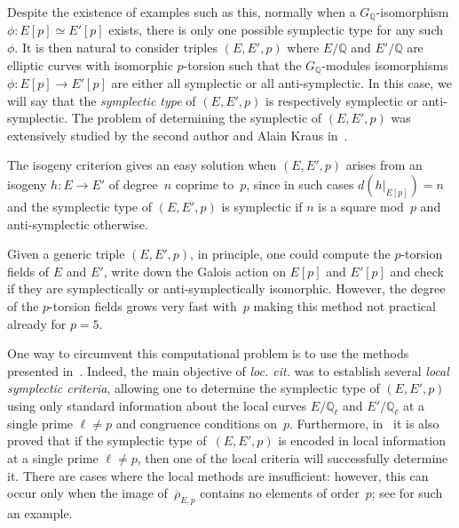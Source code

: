 \documentclass[12pt]{amsart}
\newcommand{\Q}{\mathbb{Q}}
\newcommand{\Z}{\mathbb{Z}}
\newcommand{\rhobar}{{\overline{\rho}}}
\numberwithin{equation}{section}
\theoremstyle{definition}
\theoremstyle{remark}
\begin{document}
\begin{comment}
both have $5$-torsion Galois module isomorphic to $\mu_5
\times \Z/5\Z$.  Now let $P,Q \in E[5]$ and $P',Q' \in E'[5]$ be bases
such that $P$, $P'$ are defined over~$\Q$.  The map defined by $P
\mapsto P'$ and $Q \mapsto n\cdot Q'$ (with $5 \nmid n$) is a
$G_\Q$-isomorphism which is symplectic if and only if $n$ is a square
mod~$5$.  Moreover, the automorphism $\alpha$ of $E[5]$ given by
$\alpha(P) = P$ and $\alpha(Q) = 2Q$ is anti-symplectic because $2$ is
not a square modulo~$5$.
\end{comment}

Despite the existence of examples such as this, normally when a
$G_\Q$-isomorphism $\phi : E[p] \simeq E'[p]$ exists, there is only
one possible symplectic type for any such~$\phi$.  It is then natural
to consider triples $(E,E',p)$ where $E/\Q$ and $E'/\Q$ are elliptic
curves with isomorphic $p$-torsion such that the $G_\Q$-modules
isomorphisms $\phi : E[p] \rightarrow E'[p]$ are either all symplectic
or all anti-symplectic.  In this case, we will say that the {\it
  symplectic type} of $(E,E',p)$ is respectively symplectic or
anti-symplectic.  The problem of determining the symplectic of
$(E,E',p)$ was extensively studied by the second author and Alain
Kraus in~\cite{FKSym}.

The isogeny criterion gives an easy solution when $(E,E',p)$
arises from an isogeny $h \colon E \to E'$ of degree~$n$ coprime
to~$p$, since in such cases $d(h|_{E[p]}) = n$ and the symplectic type
of $(E,E',p)$ is symplectic if $n$ is a square mod~$p$ and
anti-symplectic otherwise.

Given a generic triple $(E, E', p)$, in principle, one
could compute the $p$-torsion fields of $E$ and $E'$,
write down the Galois action on $E[p]$ and $E'[p]$ and check if they
are symplectically or anti-symplectically isomorphic. However, the
degree of the $p$-torsion fields grows very fast with~$p$ making this
method not practical already for $p = 5$.

One way to circumvent this computational problem is to use the methods
presented in~\cite{FKSym}. Indeed, the main objective of {\it
  loc. cit.} was to establish several {\it local symplectic criteria},
allowing one to determine the symplectic type of $(E,E',p)$ using only
standard information about the local curves $E/\Q_\ell$ and
$E'/\Q_\ell$ at a single prime $\ell \neq p$ and congruence conditions
on~$p$. Furthermore, in~\cite{FKSym} it is also proved that if the
symplectic type of~$(E,E',p)$ is encoded in local information at a
single prime $\ell \neq p$, then one of the local criteria will
successfully determine it.  There are cases where the local methods
are insufficient: however, this can occur only when the image
of~$\rhobar_{E,p}$ contains no elements of order~$p$; see
\cite[Proposition~16]{FKSym} for such an example.
\end{document}
